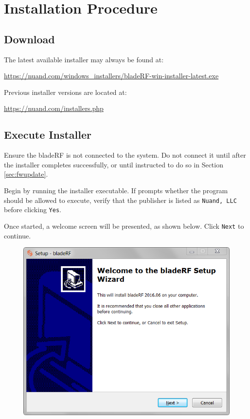 \newpage

\section{Installation Procedure}

\subsection{Download}

The latest available installer may always be found at:

{\centerline{\footnotesize{\url{https://nuand.com/windows\_installers/bladeRF-win-installer-latest.exe}}}

Previous installer versions are located at:

\centerline{\footnotesize{\url{https://nuand.com/installers.php}}}

\subsection{Execute Installer}

Ensure the bladeRF is not connected to the system. Do not connect it until
after the installer completes successfully, or until instructed to do so in
Section \ref{sec:fwupdate}.

Begin by running the installer executable. If \windows prompts whether the
program should be allowed to execute, verify that the publisher is listed as
\texttt{Nuand, LLC} before clicking \texttt{Yes}.

Once started, a welcome screen will be presented, as shown below. Click \texttt{Next} to continue.

\begin{figure}[h]
  \centering
  \includegraphics{images/windows/installer/01-welcome.png}
\end{figure}

}
